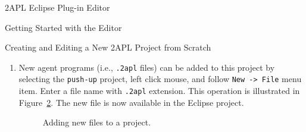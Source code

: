 \begin{chapter}{2APL Eclipse Plug-in Editor}
\begin{section}{Getting Started with the Editor}
\begin{subsection}{Creating and Editing a New 2APL Project from Scratch}
\begin{enumerate}
        \begin{figure}[ht]
            \begin{minipage}{0.3\linewidth}
                \begin{center}
                \end{center}
            \end{minipage}
            \hspace{.5cm}
            \begin{minipage}{0.6\linewidth}
            \begin{center}
            \end{center}
            \end{minipage}
        \caption{Giving a name to a new project (left), and Editing 2APL files (right).}\label{fig:usage3}
        \end{figure}

        \item New agent programs (i.e., {\tt .2apl} files) can be added to this project by
        selecting the {\tt push-up} project, left click mouse, and
        follow {\tt New -> File} menu item. Enter a file name with
        {\tt .2apl} extension. This operation is illustrated in
        Figure~\ref{fig:newfile1}. The new file is now available in the Eclipse project.

            \begin{figure}[h]
                \begin{minipage}{0.6\linewidth}
                    \begin{center}
                    \end{center}
                \end{minipage}
                \begin{minipage}{0.4\linewidth}
                    \begin{center}
                    \end{center}
                \end{minipage}
                \caption{Adding new files to a project.}\label{fig:newfile1}
            \end{figure}

\end{enumerate}


\end{subsection}
\end{section}
\end{chapter}
